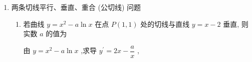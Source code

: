 \begin{enumerate}
\begin{enumerate}
\begin{jieda}
            代入直线 $y = \dfrac{1}{4}x + b$ ，得 $\ln 4 = \dfrac{1}{4} \times  4 + b$ ，即 $b = \ln 4 - 1$ .
        \end{jieda}
        \item 若直线 $y = {2x}$ 是曲线 $f\left( x\right)  = x\left( {{{e}}^{2x} - a}\right)$ 的切线，则 $a =$
        \begin{jieda}
             $f\left( x\right)  = x\left( {{{e}}^{2x} - a}\right) ,f'\left( x\right)  = \left( {1 + {2x}}\right) {{e}}^{2x} - a$ ,
            
            依题意,直线 $y = {2x}$ 是曲线 $f\left( x\right)  = x\left( {{{e}}^{2x} - a}\right)$ 的切线,
            
            设切点为 $\left( {t,{2t}}\right)$ ,则 $\left\{  \begin{matrix} t\left( {{{e}}^{2t} - a}\right)  = {2t} \\  \left( {1 + {2t}}\right) {{e}}^{2t} - a = 2 \end{matrix}\right.$ , $\left\{  \begin{matrix} t{{e}}^{2t} = \left( {2 + a}\right) t \\  \left( {1 + {2t}}\right) {{e}}^{2t} = 2 + a \end{matrix}\right.$ ,
            
            通过对比系数可得 $\left( {1 + {2t}}\right) t = t,2{t}^{2} = 0,t = 0$ ,则 $a =  - 1$ .
        \end{jieda}
        
        \item 已知函数 $f\left( x\right)  = \dfrac{1}{x} + a\ln x$ ，在点 $\left( {1,f\left( 1\right) }\right)$ 处的切线方程为 $x - y = 0$ ,则 $a =$
        \begin{jieda}
            因为 $f\left( x\right)  = \frac{1}{x} + a\ln x$ ,则 $f\left( x\right)  = \dfrac{a}{x} - \dfrac{1}{{x}^{2}}$
            
            因为函数 $f\left( x\right)$ 在点 $\left( {1,f\left( 1\right) }\right)$ 处的切线方程为 $x - y = 0$ ,则 $f\left( 1\right)  = a - 1 = 1$ ,解得 $a = 2$ ,
            
            且 $f\left( 1\right)  = 1$ ,则点 $\left( {1,f\left( 1\right) }\right)$ 在直线 $x - y = 0$ 上,合乎题意.
            
            因此, $a = 2$ .
        \end{jieda}
        
    \end{enumerate}
    \item 两条切线平行、垂直、重合 (公切线) 问题
    \begin{enumerate}
        \item 若曲线 $y = {x}^{2} - a\ln x$ 在点 $P\left( {1,1}\right)$ 处的切线与直线 $y = x - 2$ 垂直, 则实数 $a$ 的值为
        \begin{jieda}
            由 $y = {x}^{2} - a\ln x$ ,求导 ${y}^{\prime } = {2x} - \dfrac{a}{x}$ ,
            

\end{jieda}
\end{enumerate}
\end{enumerate}
